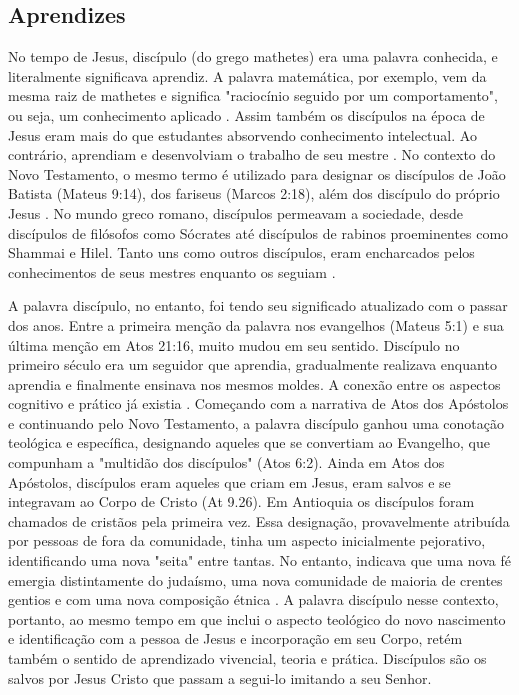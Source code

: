 \documentclass[12pt]{abntex2}
\begin{document}
\subsection{Aprendizes} 

No tempo de Jesus, discípulo (do grego mathetes) era uma palavra conhecida, e literalmente significava aprendiz. A palavra matemática, por exemplo, vem da mesma raiz de mathetes e significa "raciocínio seguido por um comportamento", ou seja, um conhecimento aplicado \cite[p. 15]{gtsm}. Assim também os discípulos na época de Jesus eram mais do que estudantes absorvendo conhecimento intelectual. Ao contrário, aprendiam e desenvolviam o trabalho de seu mestre \cite[p. 15]{gtsm}. No contexto do Novo Testamento, o mesmo termo é utilizado para designar os discípulos de João Batista (Mateus 9:14), dos fariseus (Marcos 2:18), além dos discípulo do próprio Jesus \cite[p. 59]{brandao}. No mundo greco romano, discípulos permeavam a sociedade, desde discípulos de filósofos como Sócrates até discípulos de rabinos proeminentes como Shammai e Hilel. Tanto uns como outros discípulos, eram encharcados pelos conhecimentos de seus mestres enquanto os seguiam \cite[p. 209]{shirley}.

A palavra discípulo, no entanto, foi tendo seu significado atualizado com o passar dos anos. Entre a primeira menção da palavra nos evangelhos (Mateus 5:1) e sua última menção em Atos 21:16, muito mudou em seu sentido. Discípulo no primeiro século era um seguidor que aprendia, gradualmente realizava enquanto aprendia e finalmente ensinava nos mesmos moldes. A conexão entre os aspectos cognitivo e prático já existia \cite[p. 105]{wilkins}. Começando com a narrativa de Atos dos Apóstolos e continuando pelo Novo Testamento, a palavra discípulo ganhou uma conotação teológica e específica, designando aqueles que se convertiam ao Evangelho, que compunham a "multidão dos discípulos" (Atos 6:2). Ainda em Atos dos Apóstolos, discípulos eram aqueles que criam em Jesus, eram salvos e se integravam ao Corpo de Cristo (At 9.26)\cite[p. 59-60]{brandao}. Em Antioquia os discípulos foram chamados de cristãos pela primeira vez. Essa designação, provavelmente atribuída por pessoas de fora da comunidade, tinha um aspecto inicialmente pejorativo, identificando uma nova "seita" entre tantas. No entanto, indicava que uma nova fé emergia distintamente do judaísmo, uma nova comunidade de maioria de crentes gentios e com uma nova composição étnica \cite[p. 90]{wan_diaspora_2011}. A palavra discípulo nesse contexto, portanto, ao mesmo tempo em que inclui o aspecto teológico do novo nascimento e identificação com a pessoa de Jesus e incorporação em seu Corpo, retém também o sentido de aprendizado vivencial, teoria e prática. Discípulos são os salvos por Jesus Cristo que passam a segui-lo imitando a seu Senhor.
\end{document}
